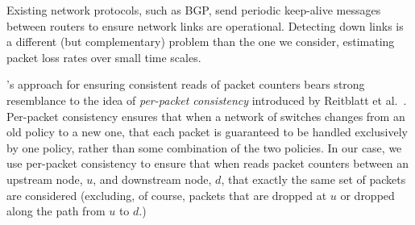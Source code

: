 Existing network protocols, such as BGP, send periodic keep-alive messages between routers to ensure network links are operational.  Detecting down links is a different (but complementary) problem than 
the one we consider, estimating packet loss rates over small time scales. 




\pcnts's approach for ensuring consistent reads of packet counters bears strong resemblance to the idea of \emph{per-packet consistency} introduced by Reitblatt et al.~\cite{Reitblatt11}.
Per-packet consistency ensures that when a network of switches changes from an old policy to a new one, that
each packet is guaranteed to be handled exclusively by one policy, rather than some combination of the two policies.  In our case, we use per-packet consistency to ensure that when \pcnt reads
packet counters between an upstream node, $u$, and downstream node, $d$, that exactly the same set of packets are considered (excluding, of course, packets that are dropped at $u$ or dropped 
along the path from $u$ to $d$.)




